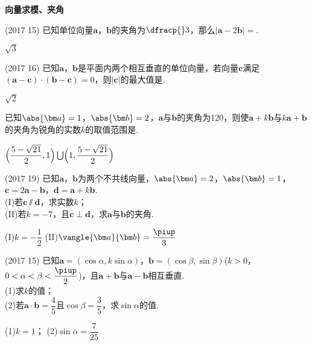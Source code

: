   \begin{exercise}{\textbf{向量求模、夹角}}
    \item%
      (2017  15)
      已知单位向量$\bm a$，$\bm b$的夹角为$\dfracp{}3$，那么$|\bm a-2\bm b|=$\tk.
      \begin{answer}
        $\sqrt3$
      \end{answer}
    \item%
      (2017  16)
      已知$\bm a$，$\bm b$是平面内两个相互垂直的单位向量，若向量$\bm c$满足$(\bm a-\bm c)\cdot(\bm b-\bm c)=0$，则$|\bm c|$的最大值是\tk.
      \begin{answer}
        $\sqrt2$
      \end{answer}
    \item%
      已知$\abs{\bm a}=1$，$\abs{\bm b}=2$，$\bm a$与$\bm b$的夹角为120\degree，则使$\bm a+k\bm b$与$k\bm a+\bm b$的夹角为锐角的实数$k$的取值范围是\tk.
      \begin{answer}
        $\Bigl(\dfrac{5-\sqrt{21}}2,1\Bigr) \bigcup \Bigl(1,\dfrac{5-\sqrt{21}}2 \Bigr)$
      \end{answer}
    \item%
      (2017  19)
      已知$\bm a$，$\bm b$为两个不共线向量，$\abs{\bm a}=2$，$\abs{\bm b}=1$，$\bm c=2\bm a-\bm b$，$\bm d=\bm a+k\bm b$.\\
      (I)若$\bm c\varparallel\bm d$，求实数$k$；\\
      (II)若$k=-7$，且$\bm c\perp\bm d$，求$\bm a$与$\bm b$的夹角.
      \begin{answer}
        (I)$k=-\dfrac12$
        (II)$\vangle{\bm a}{\bm b}=\dfrac{\piup}3$
      \end{answer}
    \vspace{4.5cm}
    \item%
      (2017  15)
      已知$\bm a=(\cos\alpha,k\sin\alpha)$，$\bm b=(\cos\beta,\sin\beta)$($k>0$，$0<\alpha<\beta<\dfrac{\piup}2$)，且$\bm a+\bm b$与$\bm a-\bm b$相互垂直.\\
      (1)求$k$的值；\\
      (2)若$\bm a\cdot\bm b=\dfrac45$且$\cos\beta=\dfrac35$，求$\sin\alpha$的值.
      \begin{answer}
        (1)$k=1$；
        (2)$\sin\alpha=\dfrac7{25}$
      \end{answer}
    \vspace{5.5cm}
  \end{exercise}
